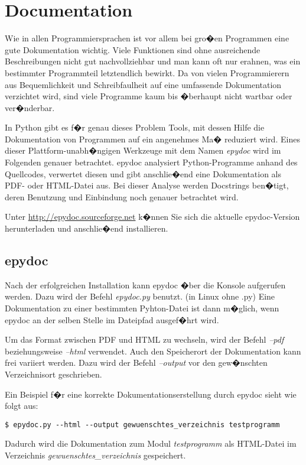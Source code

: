 
\section{Documentation}
\label{documentation:sec:Dokumentation}

Wie in allen Programmiersprachen ist vor allem bei gro�en Programmen eine gute Dokumentation wichtig. 
Viele Funktionen sind ohne ausreichende Beschreibungen nicht gut nachvollziehbar und man kann oft nur erahnen, was ein bestimmter Programmteil letztendlich bewirkt. 
Da von vielen Programmierern aus Bequemlichkeit und Schreibfaulheit auf eine umfassende Dokumentation verzichtet wird, sind viele Programme kaum bis �berhaupt nicht wartbar oder ver�nderbar. 

In Python gibt es f�r genau dieses Problem Tools, mit dessen Hilfe die Dokumentation von Programmen auf ein angenehmes Ma� reduziert wird. 
Eines dieser Plattform-unabh�ngigen Werkzeuge mit dem Namen \textit{epydoc} wird im Folgenden genauer betrachtet. 
 epydoc analysiert Python-Programme anhand des Quellcodes, verwertet diesen und gibt anschlie�end eine Dokumentation als PDF- oder HTML-Datei aus. 
Bei dieser Analyse werden Docstrings ben�tigt, deren Benutzung und Einbindung noch genauer betrachtet wird.

Unter \url{http://epydoc.sourceforge.net} k�nnen Sie sich die aktuelle epydoc-Version herunterladen und anschlie�end installieren. 


\subsection*{epydoc}
\label{documentation:sec:epydoc}

Nach der erfolgreichen Installation kann epydoc �ber die Konsole aufgerufen werden. 
Dazu wird der Befehl \textit{epydoc.py} benutzt. (in Linux ohne .py) 
Eine Dokumentation zu einer bestimmten Pyhton-Datei ist dann m�glich, wenn epydoc an der selben Stelle im Dateipfad ausgef�hrt wird. 

Um das Format zwischen PDF und HTML zu wechseln, wird der Befehl \textit{--pdf} beziehungsweise \textit{--html} verwendet. 
Auch den Speicherort der Dokumentation kann frei variiert werden. 
Dazu wird der Befehl \textit{--output} vor den gew�nschten Verzeichnisort geschrieben. 

Ein Beispiel f�r eine korrekte Dokumentationserstellung durch epydoc sieht wie folgt aus:
\begin{lstlisting}[label=documentation:lst:epydocbsp]
$ epydoc.py --html --output gewuenschtes_verzeichnis testprogramm
\end{lstlisting}
Dadurch wird die Dokumentation zum Modul \textit{testprogramm} als HTML-Datei im Verzeichnis \textit{gewuenschtes_verzeichnis} gespeichert.



